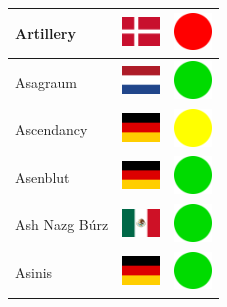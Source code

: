 \documentclass[12pt, a4paper, twoside]{report}
\begin{document}
\begin{center}
\begin{longtable}{|p{5cm}|p{2cm}|p{2cm}|}
 Artillery                                                  & \includegraphics[width=1cm]{../4x3/dk} &   \includegraphics[width=1cm]{../likes/n} \\ \hline
 Asagraum                                                   & \includegraphics[width=1cm]{../4x3/nl} &   \includegraphics[width=1cm]{../likes/y} \\ \hline
 Ascendancy                                                 & \includegraphics[width=1cm]{../4x3/de} &   \includegraphics[width=1cm]{../likes/m} \\ \hline
 Asenblut                                                   & \includegraphics[width=1cm]{../4x3/de} &   \includegraphics[width=1cm]{../likes/y} \\ \hline
 Ash Nazg Búrz                                              & \includegraphics[width=1cm]{../4x3/mx} &   \includegraphics[width=1cm]{../likes/y} \\ \hline
 Asinis                                                     & \includegraphics[width=1cm]{../4x3/de} &   \includegraphics[width=1cm]{../likes/y} \\ \hline

\end{longtable}
\end{center}
\end{document}
